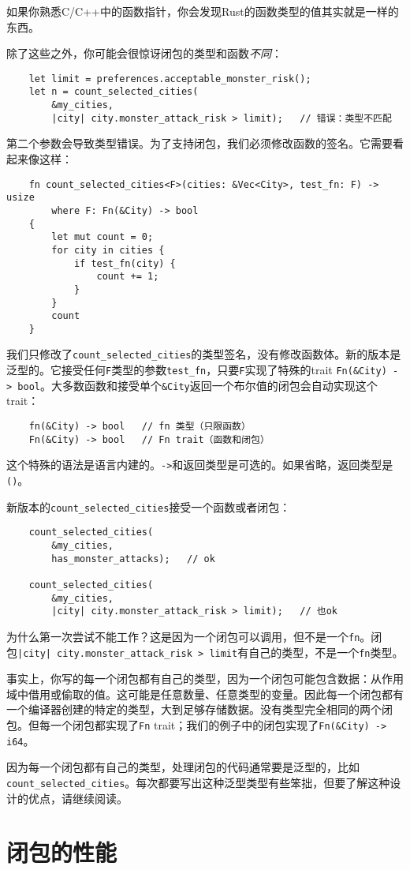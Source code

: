 如果你熟悉C/C++中的函数指针，你会发现Rust的函数类型的值其实就是一样的东西。

除了这些之外，你可能会很惊讶闭包的类型和函数\emph{不同}：
\begin{verbatim}
    let limit = preferences.acceptable_monster_risk();
    let n = count_selected_cities(
        &my_cities,
        |city| city.monster_attack_risk > limit);   // 错误：类型不匹配
\end{verbatim}

第二个参数会导致类型错误。为了支持闭包，我们必须修改函数的签名。它需要看起来像这样：
\begin{verbatim}
    fn count_selected_cities<F>(cities: &Vec<City>, test_fn: F) -> usize
        where F: Fn(&City) -> bool
    {
        let mut count = 0;
        for city in cities {
            if test_fn(city) {
                count += 1;
            }
        }
        count
    }
\end{verbatim}

我们只修改了\texttt{count\_selected\_cities}的类型签名，没有修改函数体。新的版本是泛型的。它接受任何\texttt{F}类型的参数\texttt{test\_fn}，只要\texttt{F}实现了特殊的trait \texttt{Fn(\&City) -> bool}。大多数函数和接受单个\texttt{\&City}返回一个布尔值的闭包会自动实现这个trait：
\begin{verbatim}
    fn(&City) -> bool   // fn 类型（只限函数）
    Fn(&City) -> bool   // Fn trait（函数和闭包）
\end{verbatim}

这个特殊的语法是语言内建的。\texttt{->}和返回类型是可选的。如果省略，返回类型是\texttt{()}。

新版本的\texttt{count\_selected\_cities}接受一个函数或者闭包：
\begin{verbatim}
    count_selected_cities(
        &my_cities,
        has_monster_attacks);   // ok

    count_selected_cities(
        &my_cities,
        |city| city.monster_attack_risk > limit);   // 也ok
\end{verbatim}

为什么第一次尝试不能工作？这是因为一个闭包可以调用，但不是一个\texttt{fn}。闭包\texttt{|city| city.monster\_attack\_risk > limit}有自己的类型，不是一个\texttt{fn}类型。

事实上，你写的每一个闭包都有自己的类型，因为一个闭包可能包含数据：从作用域中借用或偷取的值。这可能是任意数量、任意类型的变量。因此每一个闭包都有一个编译器创建的特定的类型，大到足够存储数据。没有类型完全相同的两个闭包。但每一个闭包都实现了\texttt{Fn} trait；我们的例子中的闭包实现了\texttt{Fn(\&City) -> i64}。

因为每一个闭包都有自己的类型，处理闭包的代码通常要是泛型的，比如\texttt{count\_selected\_cities}。每次都要写出这种泛型类型有些笨拙，但要了解这种设计的优点，请继续阅读。

\section{闭包的性能}
